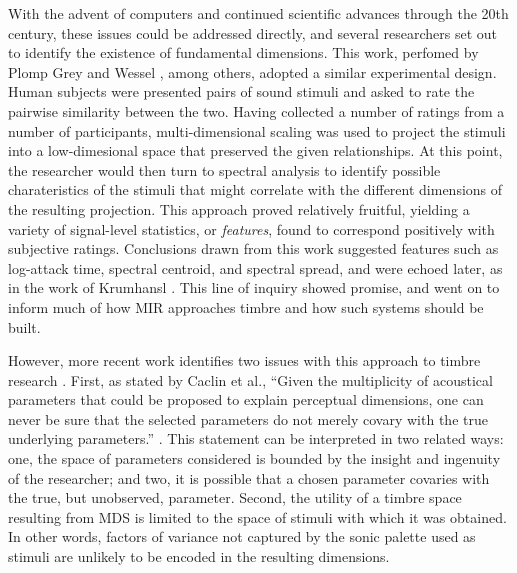 With the advent of computers and continued scientific advances through the 20th century, these issues could be addressed directly, and several researchers set out to identify the existence of fundamental dimensions.
This work, perfomed by Plomp \cite{Plomp1976} Grey and Wessel \cite{Grey1979}, among others, adopted a similar experimental design.
Human subjects were presented pairs of sound stimuli and asked to rate the pairwise similarity between the two.
Having collected a number of ratings from a number of participants, multi-dimensional scaling was used to project the stimuli into a low-dimesional space that preserved the given relationships.
At this point, the researcher would then turn to spectral analysis to identify possible charateristics of the stimuli that might correlate with the different dimensions of the resulting projection.
This approach proved relatively fruitful, yielding a variety of signal-level statistics, or \emph{features}, found to correspond positively with subjective ratings.
Conclusions drawn from this work suggested features such as log-attack time, spectral centroid, and spectral spread, and were echoed later, as in the work of Krumhansl \cite{}.
This line of inquiry showed promise, and went on to inform much of how MIR approaches timbre and how such systems should be built.

However, more recent work identifies two issues with this approach to timbre research \cite{Glennon2014}.
First, as stated by Caclin et al., ``Given the multiplicity of acoustical parameters that could be proposed to explain perceptual dimensions, one can never be sure that the selected parameters do not merely covary with the true underlying parameters.'' \cite{Caclin2005}.
This statement can be interpreted in two related ways:
one, the space of parameters considered is bounded by the insight and ingenuity of the researcher;
and two, it is possible that a chosen parameter covaries with the true, but unobserved, parameter.
Second, the utility of a timbre space resulting from MDS is limited to the space of stimuli with which it was obtained.
In other words, factors of variance not captured by the sonic palette used as stimuli are unlikely to be encoded in the resulting dimensions.

